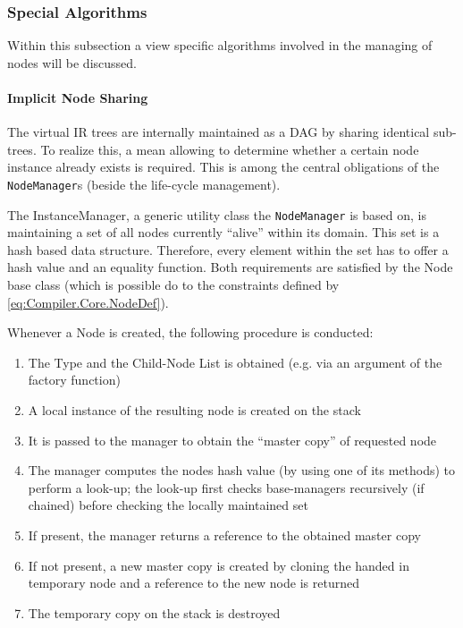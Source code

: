 \subsubsection{Special Algorithms}
Within this subsection a view specific algorithms involved in the managing of
nodes will be discussed. 

\paragraph{Implicit Node Sharing} 
The virtual IR trees are internally maintained as a DAG by sharing identical
sub-trees. To realize this, a mean allowing to determine whether a certain node
instance already exists is required. This is among the central obligations
of the \texttt{NodeManager}s (beside the life-cycle management).

The InstanceManager, a generic utility class the \texttt{NodeManager} is based on, is
maintaining a set of all nodes currently ``alive'' within its domain. This set
is a hash based data structure. Therefore, every element within the set has to
offer a hash value and an equality function. Both requirements are satisfied by
the Node base class (which is possible do to the constraints defined by
\ref{eq:Compiler.Core.NodeDef}).

Whenever a Node is created, the following procedure is conducted:
\begin{enumerate}
  \item The Type and the Child-Node List is obtained (e.g. via an argument of
  the factory function)
  \item A local instance of the resulting node is created on the stack
  \item It is passed to the manager to obtain the ``master copy'' of
  requested node
  \item The manager computes the nodes hash value (by using one of its methods)
  to perform a look-up; the look-up first checks base-managers recursively (if
  chained) before checking the locally maintained set
  \item If present, the manager returns a reference to the obtained master copy
  \item If not present, a new master copy is created by cloning the handed in
  temporary node and a reference to the new node is returned
  \item The temporary copy on the stack is destroyed 
\end{enumerate}

